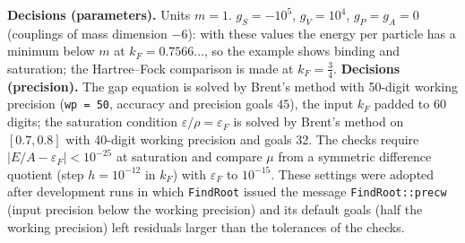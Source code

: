 \documentclass[10pt,a4paper]{article}
\begin{document}
\textbf{Decisions (parameters).} Units $m=1$. $g_S=-10^5$, $g_V=10^4$, $g_P=g_A=0$ (couplings of mass dimension $-6$): with these values the energy per particle has a minimum below $m$ at $k_F=0.7566\ldots$, so the example shows binding and saturation; the Hartree–Fock comparison is made at $k_F=\frac34$. \textbf{Decisions (precision).} The gap equation is solved by Brent’s method with 50-digit working precision (\texttt{wp = 50}, accuracy and precision goals $45$), the input $k_F$ padded to 60 digits; the saturation condition $\varepsilon/\rho=\varepsilon_F$ is solved by Brent’s method on $[0.7,0.8]$ with 40-digit working precision and goals 32. The checks require $|E/A-\varepsilon_F|<10^{-25}$ at saturation and compare $\mu$ from a symmetric difference quotient (step $h=10^{-12}$ in $k_F$) with $\varepsilon_F$ to $10^{-15}$. These settings were adopted after development runs in which \texttt{FindRoot} issued the message \texttt{FindRoot::precw} (input precision below the working precision) and its default goals (half the working precision) left residuals larger than the tolerances of the checks.
\end{document}
